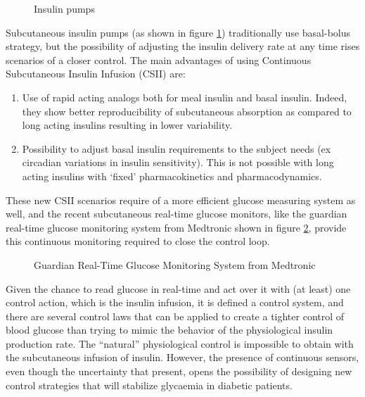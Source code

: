 \begin{figure}[hbtp]
\centering
{}\caption{Insulin pumps \cite{medtronic}}
\label{fig:pumps}
\end{figure}

Subcutaneous insulin pumps (as shown in figure \ref{fig:pumps}) traditionally use basal-bolus strategy, but the possibility of adjusting the insulin delivery rate at any time rises scenarios of a closer control. The main advantages of using Continuous Subcutaneous Insulin Infusion (CSII) are:
\begin{enumerate}
	\item Use of rapid acting analogs both for meal insulin and basal insulin. Indeed, they show better reproducibility of subcutaneous absorption as compared to long acting insulins resulting in lower variability.
	\item Possibility to adjust basal insulin requirements to the subject needs (ex circadian variations in insulin sensitivity). This is not possible with long acting insulins with `fixed' pharmacokinetics and pharmacodynamics.
\end{enumerate}

These new CSII scenarios require of a more efficient glucose measuring system as well, and the recent subcutaneous real-time glucose monitors, like the guardian real-time glucose monitoring system from Medtronic shown in figure \ref{fig:guardian}, provide this continuous monitoring required to close the control loop.

\begin{figure}[hbtp]
\centering
{}\caption{Guardian Real-Time Glucose Monitoring System from Medtronic \cite{medtronic}}
\label{fig:guardian}
\end{figure}

Given the chance to read glucose in real-time and act over it with (at least) one control action, which is the insulin infusion, it is defined a control system, and there are several control laws that can be applied to create a tighter control of blood glucose than trying to mimic the behavior of the physiological insulin production rate. The ``natural'' physiological control is impossible to obtain with the subcutaneous infusion of insulin. However, the presence of continuous sensors, even though the uncertainty that present, opens the possibility of designing new control strategies that will stabilize glycaemia in diabetic patients.

